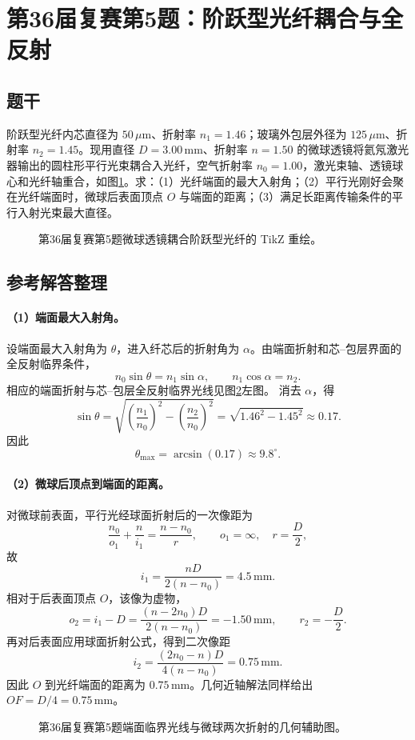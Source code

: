\section{第36届复赛第5题：阶跃型光纤耦合与全反射}
\subsection{题干}
阶跃型光纤内芯直径为 $50\,\mu\mathrm{m}$、折射率 $n_1=1.46$；玻璃外包层外径为 $125\,\mu\mathrm{m}$、折射率 $n_2=1.45$。现用直径 $D=3.00\,\mathrm{mm}$、折射率 $n=1.50$ 的微球透镜将氦氖激光器输出的圆柱形平行光束耦合入光纤，空气折射率 $n_0=1.00$，激光束轴、透镜球心和光纤轴重合，如图\ref{fig:cpho36q05}。求：（1）光纤端面的最大入射角；（2）平行光刚好会聚在光纤端面时，微球后表面顶点 $O$ 与端面的距离；（3）满足长距离传输条件的平行入射光束最大直径。
\begin{figure}[htbp]\centering

\caption{第36届复赛第5题微球透镜耦合阶跃型光纤的 TikZ 重绘。}\label{fig:cpho36q05}
\end{figure}

\subsection{参考解答整理}
\paragraph{（1）端面最大入射角。} 设端面最大入射角为 $\theta$，进入纤芯后的折射角为 $\alpha$。由端面折射和芯--包层界面的全反射临界条件，
\[
n_0\sin\theta=n_1\sin\alpha,
\qquad
n_1\cos\alpha=n_2.
\]
相应的端面折射与芯--包层全反射临界光线见图\ref{fig:cpho36q05solution}左图。
消去 $\alpha$，得
\[
\sin\theta=\sqrt{\left(\frac{n_1}{n_0}\right)^2-\left(\frac{n_2}{n_0}\right)^2}
=\sqrt{1.46^2-1.45^2}\approx0.17.
\]
因此
\[
\boxed{\theta_{\max}=\arcsin(0.17)\approx9.8^\circ.}
\]

\paragraph{（2）微球后顶点到端面的距离。} 对微球前表面，平行光经球面折射后的一次像距为
\[
\frac{n_0}{o_1}+\frac{n}{i_1}=\frac{n-n_0}{r},
\qquad o_1=\infty,\quad r=\frac D2,
\]
故
\[
i_1=\frac{nD}{2(n-n_0)}=4.5\,\mathrm{mm}.
\]
相对于后表面顶点 $O$，该像为虚物，
\[
o_2=i_1-D=\frac{(n-2n_0)D}{2(n-n_0)}=-1.50\,\mathrm{mm},
\qquad r_2=-\frac D2.
\]
再对后表面应用球面折射公式，得到二次像距
\[
\boxed{i_2=\frac{(2n_0-n)D}{4(n-n_0)}=0.75\,\mathrm{mm}.}
\]
因此 $O$ 到光纤端面的距离为 $0.75\,\mathrm{mm}$。几何近轴解法同样给出 $OF=D/4=0.75\,\mathrm{mm}$。
\begin{figure}[htbp]\centering

\caption{第36届复赛第5题端面临界光线与微球两次折射的几何辅助图。}\label{fig:cpho36q05solution}
\end{figure}


